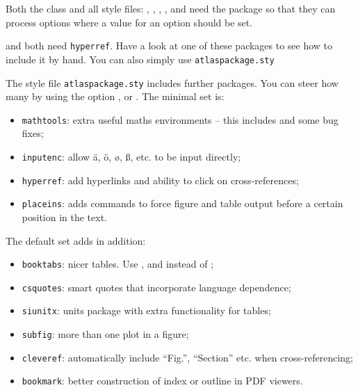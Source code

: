 Both the class  and all style files:
, , , , 
and  need the package  
so that they can process options where a value for an option should be set.

 and  both need \texttt{hyperref}. 
Have a look at one of these packages to see how to include it by hand.
You can also simply use \texttt{atlaspackage.sty}

The style file \texttt{atlaspackage.sty} includes further packages.
You can steer how many by using the option ,  or .
The minimal set is:
\begin{itemize}\setlength{\parskip}{0pt}\setlength{\itemsep}{0pt}
\item \texttt{mathtools}: extra useful maths environments -- this includes  and some bug fixes;
\item \texttt{inputenc}: allow ä, ö, ø, ß, etc. to be input directly;
\item \texttt{hyperref}: add hyperlinks and ability to click on cross-references;
\item \texttt{placeins}: adds commands to force figure and table output before a certain position in the text.
\end{itemize}

The default set adds in addition:
\begin{itemize}\setlength{\parskip}{0pt}\setlength{\itemsep}{0pt}
\item \texttt{booktabs}: nicer tables. Use ,  and  instead of ;
\item \texttt{csquotes}: smart quotes that incorporate language dependence;
\item \texttt{siunitx}: units package with extra functionality for tables;
\item \texttt{subfig}: more than one plot in a figure;
\item \texttt{cleveref}: automatically include \enquote{Fig.}, \enquote{Section} etc. when cross-referencing;
\item \texttt{bookmark}: better construction of index or outline in PDF viewers.
\end{itemize}

